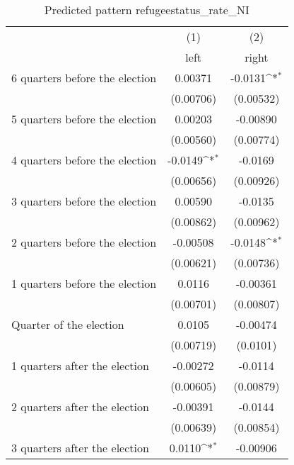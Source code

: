 \begin{table}[htbp]\centering
\def\sym#1{\ifmmode^{#1}\else\(^{#1}\)\fi}
\caption{Predicted pattern refugeestatus\_rate\_NI}
\begin{tabular}{l*{2}{c}}
\hline\hline
                    &\multicolumn{1}{c}{(1)}&\multicolumn{1}{c}{(2)}\\
                    &\multicolumn{1}{c}{left}&\multicolumn{1}{c}{right}\\
\hline
 6 quarters before the election&     0.00371         &     -0.0131\sym{*}  \\
                    &   (0.00706)         &   (0.00532)         \\
[1em]
 5 quarters before the election&     0.00203         &    -0.00890         \\
                    &   (0.00560)         &   (0.00774)         \\
[1em]
 4 quarters before the election&     -0.0149\sym{*}  &     -0.0169         \\
                    &   (0.00656)         &   (0.00926)         \\
[1em]
 3 quarters before the election&     0.00590         &     -0.0135         \\
                    &   (0.00862)         &   (0.00962)         \\
[1em]
 2 quarters before the election&    -0.00508         &     -0.0148\sym{*}  \\
                    &   (0.00621)         &   (0.00736)         \\
[1em]
 1 quarters before the election&      0.0116         &    -0.00361         \\
                    &   (0.00701)         &   (0.00807)         \\
[1em]
Quarter of the election&      0.0105         &    -0.00474         \\
                    &   (0.00719)         &    (0.0101)         \\
[1em]
 1 quarters after the election&    -0.00272         &     -0.0114         \\
                    &   (0.00605)         &   (0.00879)         \\
[1em]
 2 quarters after the election&    -0.00391         &     -0.0144         \\
                    &   (0.00639)         &   (0.00854)         \\
[1em]
 3 quarters after the election&      0.0110\sym{*}  &    -0.00906         \\

\end{tabular}
\end{table}
